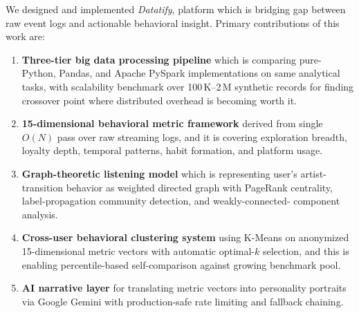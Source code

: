 \documentclass[conference]{IEEEtran}
\begin{document}
We designed and implemented \textit{Datatify}, platform which is bridging gap between raw event logs and actionable behavioral insight. Primary contributions of this work are:
\begin{enumerate}
  \item \textbf{Three-tier big data processing pipeline} which is comparing
        pure-Python, Pandas, and Apache PySpark implementations on same
        analytical tasks, with scalability benchmark over 100\,K--2\,M
        synthetic records for finding crossover point where distributed
        overhead is becoming worth it.
  \item \textbf{15-dimensional behavioral metric framework} derived from
        single $O(N)$ pass over raw streaming logs, and it is covering exploration
        breadth, loyalty depth, temporal patterns, habit formation, and
        platform usage.
  \item \textbf{Graph-theoretic listening model} which is representing user's
        artist-transition behavior as weighted directed graph with PageRank
        centrality, label-propagation community detection, and weakly-connected-
        component analysis.
  \item \textbf{Cross-user behavioral clustering system} using K-Means on
        anonymized 15-dimensional metric vectors with automatic optimal-$k$
        selection, and this is enabling percentile-based self-comparison against
        growing benchmark pool.
  \item \textbf{AI narrative layer} for translating metric vectors into
        personality portraits via Google Gemini with production-safe
        rate limiting and fallback chaining.
\end{enumerate}
\end{document}
